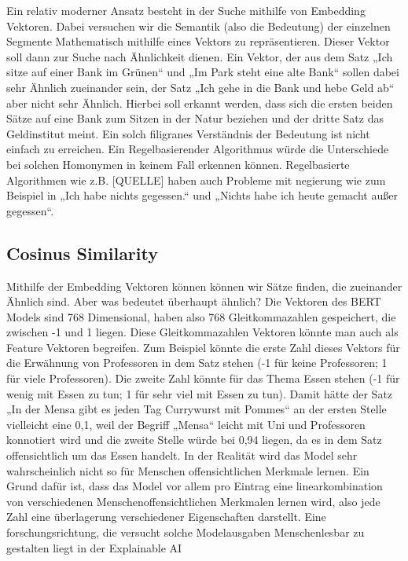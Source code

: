  

Ein relativ moderner Ansatz besteht in der Suche mithilfe von Embedding Vektoren. Dabei versuchen wir die Semantik (also die Bedeutung) der einzelnen Segmente Mathematisch mithilfe eines Vektors zu repräsentieren. Dieser Vektor soll dann zur Suche nach Ähnlichkeit dienen. Ein Vektor, der aus dem Satz „Ich sitze auf einer Bank im Grünen“ und „Im Park steht eine alte Bank“ sollen dabei sehr Ähnlich zueinander sein, der Satz „Ich gehe in die Bank und hebe Geld ab“ aber nicht sehr Ähnlich. Hierbei soll erkannt werden, dass sich die ersten beiden Sätze auf eine Bank zum Sitzen in der Natur beziehen und der dritte Satz das Geldinstitut meint. Ein solch filigranes Verständnis der Bedeutung ist nicht einfach zu erreichen. 
Ein Regelbasierender Algorithmus würde die Unterschiede bei solchen Homonymen in keinem Fall erkennen können. Regelbasierte Algorithmen wie z.B. [QUELLE] haben auch Probleme mit negierung wie zum Beispiel in „Ich habe nichts gegessen.“ und „Nichts habe ich heute gemacht außer gegessen“.

\subsection{Cosinus Similarity}


Mithilfe der Embedding Vektoren können können wir Sätze finden, die zueinander Ähnlich sind. Aber was bedeutet überhaupt ähnlich? Die Vektoren des BERT Models sind 768 Dimensional, haben also 768 Gleitkommazahlen gespeichert, die zwischen -1 und 1 liegen. Diese Gleitkommazahlen Vektoren könnte man auch als Feature Vektoren begreifen. Zum Beispiel könnte die erste Zahl dieses Vektors für die Erwähnung von Professoren in dem Satz stehen (-1 für keine Professoren; 1 für viele Professoren). Die zweite Zahl könnte für das Thema Essen stehen (-1 für wenig mit Essen zu tun; 1 für sehr viel mit Essen zu tun). Damit hätte der Satz „In der Mensa gibt es jeden Tag Currywurst mit Pommes“ an der ersten Stelle vielleicht eine 0,1, weil der Begriff „Mensa“ leicht mit Uni und Professoren konnotiert wird und die zweite Stelle würde bei 0,94 liegen, da es in dem Satz offensichtlich um das Essen handelt. 
In der Realität wird das Model sehr wahrscheinlich nicht so für Menschen offensichtlichen Merkmale lernen. Ein Grund dafür ist, dass das Model vor allem pro Eintrag eine linearkombination von verschiedenen Menschenoffensichtlichen Merkmalen lernen wird, also jede Zahl eine überlagerung verschiedener Eigenschaften darstellt. 
Eine forschungsrichtung, die versucht solche Modelausgaben Menschenlesbar zu gestalten liegt in der Explainable AI

